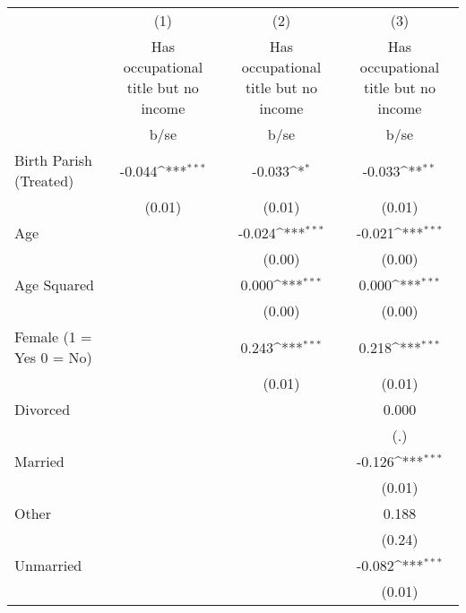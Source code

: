 {
\def\sym#1{\ifmmode^{#1}\else\(^{#1}\)\fi}
\begin{tabular}{l*{3}{c}}
\hline\hline
                    &\multicolumn{1}{c}{(1)}&\multicolumn{1}{c}{(2)}&\multicolumn{1}{c}{(3)}\\
                    &\multicolumn{1}{c}{Has occupational title but no income}&\multicolumn{1}{c}{Has occupational title but no income}&\multicolumn{1}{c}{Has occupational title but no income}\\
                    &        b/se         &        b/se         &        b/se         \\
\hline
Birth Parish (Treated)&      -0.044\sym{***}&      -0.033\sym{*}  &      -0.033\sym{**} \\
                    &      (0.01)         &      (0.01)         &      (0.01)         \\
Age                 &                     &      -0.024\sym{***}&      -0.021\sym{***}\\
                    &                     &      (0.00)         &      (0.00)         \\
Age Squared         &                     &       0.000\sym{***}&       0.000\sym{***}\\
                    &                     &      (0.00)         &      (0.00)         \\
Female (1 = Yes 0 = No)&                     &       0.243\sym{***}&       0.218\sym{***}\\
                    &                     &      (0.01)         &      (0.01)         \\
Divorced            &                     &                     &       0.000         \\
                    &                     &                     &         (.)         \\
Married             &                     &                     &      -0.126\sym{***}\\
                    &                     &                     &      (0.01)         \\
Other               &                     &                     &       0.188         \\
                    &                     &                     &      (0.24)         \\
Unmarried           &                     &                     &      -0.082\sym{***}\\
                    &                     &                     &      (0.01)         \\

\end{tabular}}
